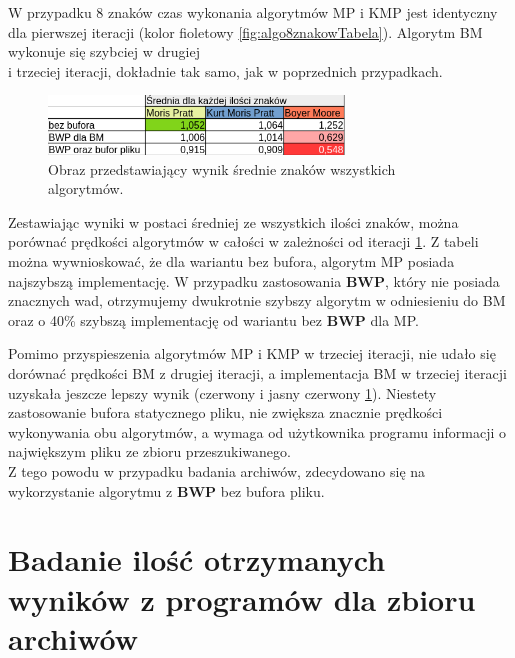 W przypadku 8 znaków czas wykonania algorytmów MP i KMP jest identyczny dla
pierwszej iteracji (kolor fioletowy \ref{fig:algo8znakowTabela}). Algorytm 
BM wykonuje się szybciej w drugiej \\ i trzeciej iteracji, dokładnie tak samo,
jak w poprzednich przypadkach.

\begin{figure}[htb]
    \centering
    \includegraphics[width=0.7\textwidth]{./images/tabela-algo-srednia.png}
    \caption{Obraz przedstawiający wynik średnie znaków wszystkich algorytmów.}
    \label{fig:algoAvgTabela}
\end{figure}

Zestawiając wyniki w postaci średniej ze wszystkich ilości znaków, można
porównać prędkości algorytmów w całości w zależności od iteracji 
\ref{fig:algoAvgTabela}. Z tabeli można wywnioskować, że dla wariantu bez
bufora, algorytm MP posiada najszybszą implementację. W przypadku zastosowania
\textbf{BWP}, który nie posiada znacznych wad, otrzymujemy dwukrotnie szybszy
algorytm w odniesieniu do BM oraz o 40\% szybszą implementację od 
wariantu bez \textbf{BWP} dla MP. 

Pomimo przyspieszenia algorytmów MP i KMP w trzeciej iteracji, nie udało się
dorównać prędkości BM z drugiej iteracji, a implementacja BM w trzeciej iteracji
uzyskała jeszcze lepszy wynik (czerwony i jasny czerwony \ref{fig:algoAvgTabela}).
Niestety zastosowanie bufora statycznego pliku, nie zwiększa znacznie prędkości
wykonywania obu algorytmów, a wymaga od użytkownika programu informacji o 
największym pliku ze zbioru przeszukiwanego. \\ Z tego powodu w przypadku badania
archiwów, zdecydowano się na wykorzystanie algorytmu z \textbf{BWP} bez
bufora pliku.

\section{Badanie ilość otrzymanych wyników z programów dla zbioru archiwów}

